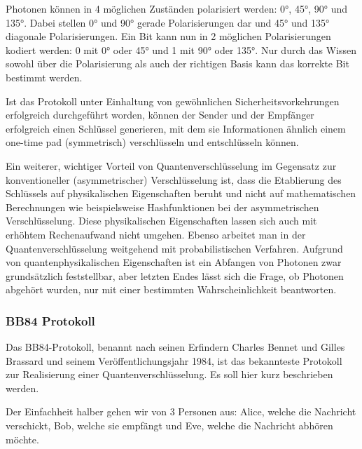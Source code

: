 \documentclass[a4paper,10.2pt,pdftex]{scrartcl}%
\begin{document}
Photonen können in 4 möglichen Zuständen polarisiert werden: 0°, 45°, 90° und 135°. Dabei stellen 0° und 90° gerade Polarisierungen dar und 45° und 135° diagonale Polarisierungen. Ein Bit kann nun in 2 möglichen Polarisierungen kodiert werden: 0 mit 0° oder 45° und 1 mit 90° oder 135°. Nur durch das Wissen sowohl über die Polarisierung als auch der richtigen Basis kann das korrekte Bit bestimmt werden.

Ist das Protokoll unter Einhaltung von gewöhnlichen Sicherheitsvorkehrungen erfolgreich durchgeführt worden, können der Sender und der Empfänger erfolgreich einen Schlüssel generieren, mit dem sie Informationen ähnlich einem one-time pad (symmetrisch) verschlüsseln und entschlüsseln können. 

Ein weiterer, wichtiger Vorteil von Quantenverschlüsselung im Gegensatz zur konventioneller (asymmetrischer) Verschlüsselung ist, dass die Etablierung des Schlüssels auf physikalischen Eigenschaften beruht und nicht auf mathematischen Berechnungen wie beispielsweise Hashfunktionen bei der asymmetrischen Verschlüsselung. Diese physikalischen Eigenschaften lassen sich auch mit erhöhtem Rechenaufwand nicht umgehen. Ebenso arbeitet man in der Quantenverschlüsselung weitgehend mit probabilistischen Verfahren. Aufgrund von quantenphysikalischen Eigenschaften ist ein Abfangen von Photonen zwar grundsätzlich feststellbar, aber letzten Endes lässt sich die Frage, ob Photonen abgehört wurden, nur mit einer bestimmten Wahrscheinlichkeit beantworten. 


\subsubsection{BB84 Protokoll}
Das BB84-Protokoll, benannt nach seinen Erfindern Charles Bennet und Gilles Brassard und seinem Veröffentlichungsjahr 1984, ist das bekannteste Protokoll zur Realisierung einer Quantenverschlüsselung. Es soll hier kurz beschrieben werden.

Der Einfachheit halber gehen wir von 3 Personen aus: Alice, welche die Nachricht verschickt, Bob, welche sie empfängt und Eve, welche die Nachricht abhören möchte.
\end{document}
